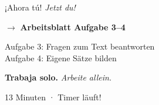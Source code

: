 \documentclass[aspectratio=169, 11pt]{beamer}
\newcommand{\seriftext}[1]{{\fontfamily{ppl}\selectfont #1}}
\newcommand{\es}[1]{\seriftext{\textbf{#1}}}
\newcommand{\de}[1]{\textit{\textcolor{mittelgrau}{#1}}}
\newcommand{\abmark}[1]{{\Large$\rightarrow$ \textbf{Arbeitsblatt Aufgabe #1}}}
\newcommand{\zeit}[1]{{\small\textcolor{mittelgrau}{#1}}}
\begin{document}
\begin{frame}{¡Ahora tú! \de{Jetzt du!}}
    \vspace{1cm}

    \begin{center}
        \abmark{3--4}

        \vspace{0.8cm}

        {\large Aufgabe 3: Fragen zum Text beantworten}\\
        {\large Aufgabe 4: Eigene Sätze bilden}

        \vspace{0.8cm}

        \es{Trabaja solo.} \de{Arbeite allein.}

        \vspace{0.5cm}

        \zeit{13 Minuten · Timer läuft!}
    \end{center}
\end{frame}

\end{document}
